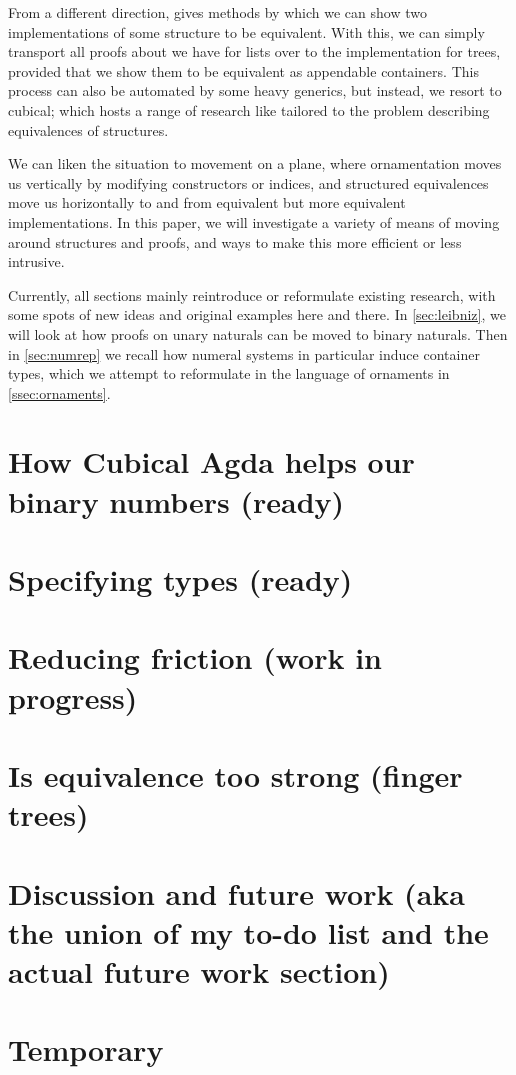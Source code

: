 \documentclass{article}
\theoremstyle{plain}%
\theoremstyle{definition}
\begin{document}
From a different direction, \cite{calcdata} gives methods by which we can show two implementations of some structure to be equivalent. With this, we can simply transport all proofs about \AgdaFunction{\_++\_} we have for lists over to the implementation for trees, provided that we show them to be equivalent as appendable containers. This process can also be automated by some heavy generics, but instead, we resort to cubical; which hosts a range of research like \cite{iri} tailored to the problem describing equivalences of structures.

We can liken the situation to movement on a plane, where ornamentation moves us vertically by modifying constructors or indices, and structured equivalences move us horizontally to and from equivalent but more equivalent implementations. In this paper, we will investigate a variety of means of moving around structures and proofs, and ways to make this more efficient or less intrusive.

Currently, all sections mainly reintroduce or reformulate existing research, with some spots of new ideas and original examples here and there. In \autoref{sec:leibniz}, we will look at how proofs on unary naturals can be moved to binary naturals. Then in \autoref{sec:numrep} we recall how numeral systems in particular induce container types, which we attempt to reformulate in the language of ornaments in \autoref{ssec:ornaments}.


\section{How Cubical Agda helps our binary numbers (ready)}\label{sec:leibniz}


\section{Specifying types (ready)}\label{sec:numrep}


\section{Reducing friction (work in progress)}\label{sec:userfriendly}


\section{Is equivalence too strong (finger trees)}\label{sec:weakening}



\section{Discussion and future work (aka the union of my to-do list and the actual future work section)}\label{sec:discussion}



\section{Temporary}\label{sec:temp}
\listoftodos
%


\printbibliography
\end{document}
